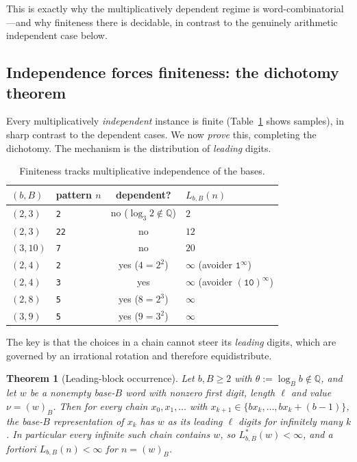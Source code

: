 \documentclass[11pt]{article}
\theoremstyle{plain}
\newtheorem{theorem}{Theorem}
\theoremstyle{definition}
\theoremstyle{remark}
\newcommand{\QQ}{\mathbb{Q}}
\newcommand{\Lbb}{L_{b,B}}
\begin{document}
This is exactly why the multiplicatively dependent regime is word-combinatorial---and why finiteness there is decidable, in contrast to the genuinely arithmetic independent case below.

\subsection{Independence forces finiteness: the dichotomy theorem}\label{sec:indep}

Every multiplicatively \emph{independent} instance is finite (Table~\ref{tab:cross} shows samples), in sharp contrast to the dependent cases. We now \emph{prove} this, completing the dichotomy. The mechanism is the distribution of \emph{leading} digits.

\begin{table}[h]
\centering
\begin{tabular}{llc l}
\toprule
$(b,B)$ & pattern $n$ & dependent? & $\Lbb(n)$ \\
\midrule
$(2,3)$  & \texttt{2}    & no ($\log_3 2\notin\QQ$) & $2$ \\
$(2,3)$  & \texttt{22}   & no & $12$ \\
$(3,10)$ & \texttt{7}    & no & $20$ \\
$(2,4)$  & \texttt{2}    & yes ($4=2^{2}$) & $\infty$ \quad(avoider $\texttt{1}^{\infty}$) \\
$(2,4)$  & \texttt{3}    & yes & $\infty$ \quad(avoider $(\texttt{10})^{\infty}$) \\
$(2,8)$  & \texttt{5}    & yes ($8=2^{3}$) & $\infty$ \\
$(3,9)$  & \texttt{5}    & yes ($9=3^{2}$) & $\infty$ \\
\bottomrule
\end{tabular}
\caption{Finiteness tracks multiplicative independence of the bases.}
\label{tab:cross}
\end{table}

The key is that the choices in a chain cannot steer its \emph{leading} digits, which are governed by an irrational rotation and therefore equidistribute.

\begin{theorem}[Leading-block occurrence]\label{thm:leading}
Let $b,B\ge2$ with $\theta:=\log_B b\notin\QQ$, and let $w$ be a nonempty base-$B$ word with nonzero first digit, length $\ell$ and value $\nu=(w)_B$. Then for \emph{every} chain $x_0,x_1,\dots$ with $x_{k+1}\in\{bx_k,\dots,bx_k+(b-1)\}$, the base-$B$ representation of $x_k$ has $w$ as its leading $\ell$ digits for infinitely many $k$. In particular every infinite such chain contains $w$, so $L^{*}_{b,B}(w)<\infty$, and a fortiori $\Lbb(n)<\infty$ for $n=(w)_B$.
\end{theorem}
\end{document}

